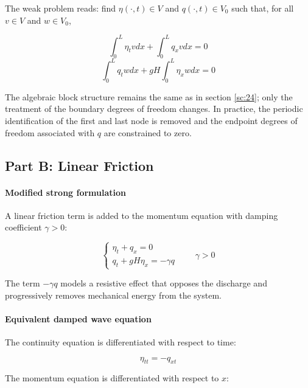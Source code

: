 The weak problem reads: find \(\eta(\cdot,t)\in V\) and \(q(\cdot,t)\in V_0\) such that, for all \(v\in V\) and \(w\in V_0\),

\begin{equation}
\int_0^L \eta_t v  dx + \int_0^L q_x v  dx = 0
\label{eq:wall_weak_1}
\end{equation}
\begin{equation}
\int_0^L q_t w  dx + gH\int_0^L \eta_x w  dx = 0
\label{eq:wall_weak_2}
\end{equation}

The algebraic block structure remains the same as in section \ref{sc:24}; only the treatment of the boundary degrees of freedom changes. In practice, the periodic identification of the first and last node is removed and the endpoint degrees of freedom associated with \(q\) are constrained to zero.

\subsection{Part B: Linear Friction}
\label{ssc:252}

\paragraph{Modified strong formulation}
A linear friction term is added to the momentum equation with damping coefficient \(\gamma > 0\):

\begin{equation}
\begin{cases}
\eta_t + q_x = 0\\
q_t + gH\eta_x = -\gamma q
\end{cases}
\qquad \gamma>0
\label{eq:friction_system_hw2}
\end{equation}

The term \(-\gamma q\) models a resistive effect that opposes the discharge and progressively removes mechanical energy from the system.

\paragraph{Equivalent damped wave equation}
The continuity equation is differentiated with respect to time:

\begin{equation}
\eta_{tt} = -q_{xt}
\label{eq:eta_tt_from_continuity}
\end{equation}

The momentum equation is differentiated with respect to \(x\):

